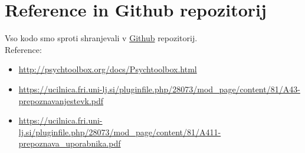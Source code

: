 \documentclass[12pt]{article}
\begin{document}
\section{Reference in Github repozitorij}
Vso kodo smo sproti shranjevali v 
\href{https://github.com/leonleon123/prepoznavanje_uporabnika_tipkovnice}{Github} repozitorij.\\
\newline
Reference:
\begin{itemize}
  \item \url{http://psychtoolbox.org/docs/Psychtoolbox.html}
  \item \url{https://ucilnica.fri.uni-lj.si/pluginfile.php/28073/mod_page/content/81/A43-prepoznavanjestevk.pdf}
  \item \url{https://ucilnica.fri.uni-lj.si/pluginfile.php/28073/mod_page/content/81/A411-prepoznava_uporabnika.pdf}
\end{itemize}
\end{document}
